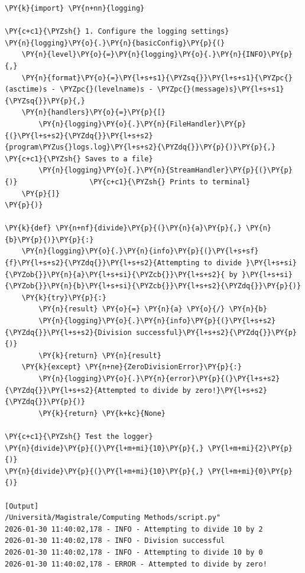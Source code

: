 \begin{Verbatim}[label=\makebox{\url{logging_config.py}},commandchars=\\\{\}]
\PY{k}{import} \PY{n+nn}{logging}

\PY{c+c1}{\PYZsh{} 1. Configure the logging settings}
\PY{n}{logging}\PY{o}{.}\PY{n}{basicConfig}\PY{p}{(}
    \PY{n}{level}\PY{o}{=}\PY{n}{logging}\PY{o}{.}\PY{n}{INFO}\PY{p}{,}
    \PY{n}{format}\PY{o}{=}\PY{l+s+s1}{\PYZsq{}}\PY{l+s+s1}{\PYZpc{}(asctime)s - \PYZpc{}(levelname)s - \PYZpc{}(message)s}\PY{l+s+s1}{\PYZsq{}}\PY{p}{,}
    \PY{n}{handlers}\PY{o}{=}\PY{p}{[}
        \PY{n}{logging}\PY{o}{.}\PY{n}{FileHandler}\PY{p}{(}\PY{l+s+s2}{\PYZdq{}}\PY{l+s+s2}{program\PYZus{}logs.log}\PY{l+s+s2}{\PYZdq{}}\PY{p}{)}\PY{p}{,} \PY{c+c1}{\PYZsh{} Saves to a file}
        \PY{n}{logging}\PY{o}{.}\PY{n}{StreamHandler}\PY{p}{(}\PY{p}{)}                 \PY{c+c1}{\PYZsh{} Prints to terminal}
    \PY{p}{]}
\PY{p}{)}

\PY{k}{def} \PY{n+nf}{divide}\PY{p}{(}\PY{n}{a}\PY{p}{,} \PY{n}{b}\PY{p}{)}\PY{p}{:}
    \PY{n}{logging}\PY{o}{.}\PY{n}{info}\PY{p}{(}\PY{l+s+sf}{f}\PY{l+s+s2}{\PYZdq{}}\PY{l+s+s2}{Attempting to divide }\PY{l+s+si}{\PYZob{}}\PY{n}{a}\PY{l+s+si}{\PYZcb{}}\PY{l+s+s2}{ by }\PY{l+s+si}{\PYZob{}}\PY{n}{b}\PY{l+s+si}{\PYZcb{}}\PY{l+s+s2}{\PYZdq{}}\PY{p}{)}
    \PY{k}{try}\PY{p}{:}
        \PY{n}{result} \PY{o}{=} \PY{n}{a} \PY{o}{/} \PY{n}{b}
        \PY{n}{logging}\PY{o}{.}\PY{n}{info}\PY{p}{(}\PY{l+s+s2}{\PYZdq{}}\PY{l+s+s2}{Division successful}\PY{l+s+s2}{\PYZdq{}}\PY{p}{)}
        \PY{k}{return} \PY{n}{result}
    \PY{k}{except} \PY{n+ne}{ZeroDivisionError}\PY{p}{:}
        \PY{n}{logging}\PY{o}{.}\PY{n}{error}\PY{p}{(}\PY{l+s+s2}{\PYZdq{}}\PY{l+s+s2}{Attempted to divide by zero!}\PY{l+s+s2}{\PYZdq{}}\PY{p}{)}
        \PY{k}{return} \PY{k+kc}{None}

\PY{c+c1}{\PYZsh{} Test the logger}
\PY{n}{divide}\PY{p}{(}\PY{l+m+mi}{10}\PY{p}{,} \PY{l+m+mi}{2}\PY{p}{)}
\PY{n}{divide}\PY{p}{(}\PY{l+m+mi}{10}\PY{p}{,} \PY{l+m+mi}{0}\PY{p}{)}

[Output]
/Università/Magistrale/Computing Methods/script.py"
2026-01-30 11:40:02,178 - INFO - Attempting to divide 10 by 2
2026-01-30 11:40:02,178 - INFO - Division successful
2026-01-30 11:40:02,178 - INFO - Attempting to divide 10 by 0
2026-01-30 11:40:02,178 - ERROR - Attempted to divide by zero!
\end{Verbatim}